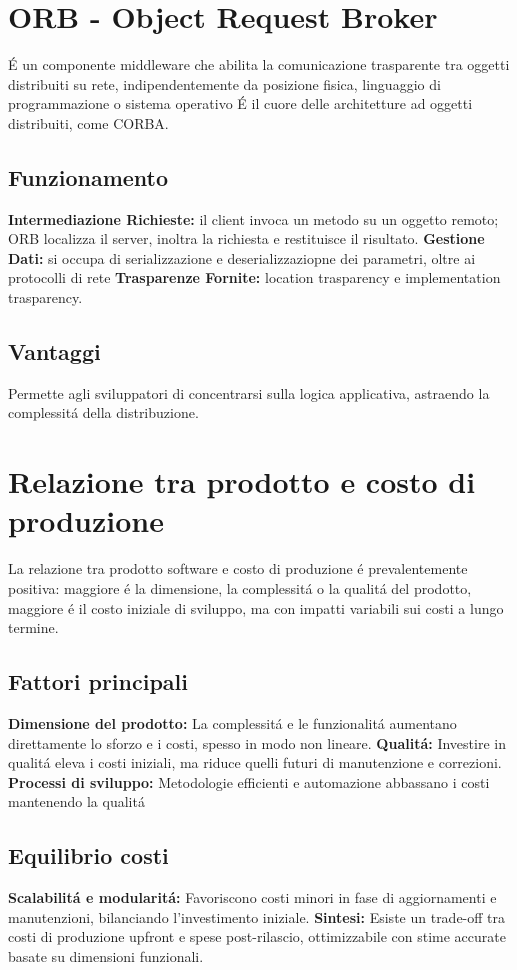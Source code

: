 \documentclass[11pt]{article}
\begin{document}
\section{ORB - Object Request Broker}
\label{sec:org5f68520}
É un componente middleware che abilita la comunicazione trasparente tra oggetti distribuiti su rete, indipendentemente da posizione fisica, linguaggio di programmazione o sistema operativo
É il cuore delle architetture ad oggetti distribuiti, come CORBA.
\subsection{Funzionamento}
\label{sec:orgacb0c6f}
\textbf{\textbf{Intermediazione Richieste:}} il client invoca un metodo su un oggetto remoto; ORB localizza il server, inoltra la richiesta e restituisce il risultato.
\textbf{\textbf{Gestione Dati:}} si occupa di serializzazione e deserializzaziopne dei parametri, oltre ai protocolli di rete
\textbf{\textbf{Trasparenze Fornite:}} location trasparency e implementation trasparency.
\subsection{Vantaggi}
\label{sec:orga9e5b75}
Permette agli sviluppatori di concentrarsi sulla logica applicativa, astraendo la complessitá della distribuzione.
\section{Relazione tra prodotto e costo di produzione}
\label{sec:org7fb839c}
La relazione tra prodotto software e costo di produzione é prevalentemente positiva: maggiore é la dimensione, la complessitá o la qualitá del prodotto, maggiore é il costo iniziale di sviluppo, ma con impatti variabili sui costi a lungo termine.
\subsection{Fattori principali}
\label{sec:org87ca17d}
\textbf{\textbf{Dimensione del prodotto:}} La complessitá e le funzionalitá aumentano direttamente lo sforzo e i costi, spesso in modo non lineare.
\textbf{\textbf{Qualitá:}} Investire in qualitá eleva i costi iniziali, ma riduce quelli futuri di manutenzione e correzioni.
\textbf{\textbf{Processi di sviluppo:}} Metodologie efficienti e automazione abbassano i costi mantenendo la qualitá
\subsection{Equilibrio costi}
\label{sec:org6b042db}
\textbf{\textbf{Scalabilitá e modularitá:}} Favoriscono costi minori in fase di aggiornamenti e manutenzioni, bilanciando l'investimento iniziale.
\textbf{\textbf{Sintesi:}} Esiste un trade-off tra costi di produzione upfront e spese post-rilascio, ottimizzabile con stime accurate basate su dimensioni funzionali.
\end{document}
